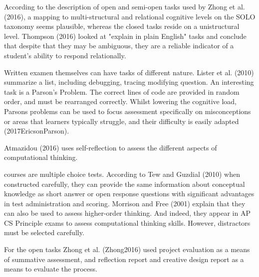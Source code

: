 According to the description of open and semi-open tasks used by Zhong et al. (2016), a mapping to multi-structural and relational cognitive levels on the SOLO taxonomy seems plausible, whereas the closed tasks reside on a unistructural level. Thompson (2016) looked at "explain in plain English" tasks and conclude that despite that they may be ambiguous, they are a reliable indicator of a student’s ability to respond relationally.


Written examen themselves can have tasks of different nature. Lister et al. (2010) summarize a list, including debugging, tracing modifying question. An interesting task is a Parson's Problem. The correct lines of code are provided in random order, and must be rearranged correctly. Whilst lowering the cognitive load, Parsons problems can be used to focus assessment specifically on misconceptions or areas that learners typically struggle, and their difficulty is easily adapted (2017EricsonParson).

Atmazidou (2016) uses self-reflection to assess the different aspects of computational thinking.

courses are multiple choice tests. According to Tew and Guzdial (2010) when constructed carefully, they can provide the same information about conceptual knowledge as short answer or open response questions with significant advantages in test administration and scoring. Morrison and Free (2001) explain that they can also be used to assess higher-order thinking. And indeed, they appear in AP CS Principle exams to assess computational thinking skills. However, distractors must be selected carefully.


For the open tasks Zhong et al. (Zhong2016) used project evaluation as a means of summative assessment, and reflection report and creative design report as a means to evaluate the process.




